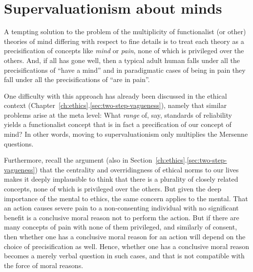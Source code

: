 \section{Supervaluationism about minds}
A tempting solution to the problem of the multiplicity of functionalist (or other) theories of mind differing with respect
to fine details is to treat each theory as a precisification of concepts like \textit{mind} or \textit{pain}, none of which
is privileged over the others. And,
if all has gone well, then a typical adult human falls under all the precisifications of ``have a mind'' and in paradigmatic cases of being in pain they fall under all the precisifications of ``are in pain''. 

One difficulty with this approach has already been discussed in the ethical context (Chapter~\ref{ch:ethics}.\ref{sec:two-step-vagueness}), namely that similar problems
arise at the meta level: What \textit{range} of, say, standards of reliability yields a functionalist concept that is in fact a 
precification of our concept of mind? In other words, moving to supervaluationism only multiplies the Mersenne
questions.

Furthermore, recall the argument (also in Section~\ref{ch:ethics}.\ref{sec:two-step-vagueness}) that the centrality and overridingness of ethical norms to our lives makes it 
deeply implausible to think that there is a plurality of closely related concepts, none of which is privileged over the others.
But given the deep importance of the mental to ethics, the same concern applies to the mental. That an action causes severe
pain to a non-consenting individual with no significant benefit is a conclusive moral reason not to perform the action. 
But if there are many concepts of pain with none of them privileged, and similarly of consent, then whether one has a
conclusive moral reason for an action will depend on the choice of precisification as well. Hence, whether one has a 
conclusive moral reason becomes a merely verbal question in such cases, and that is not compatible with the force of moral
reasons.

